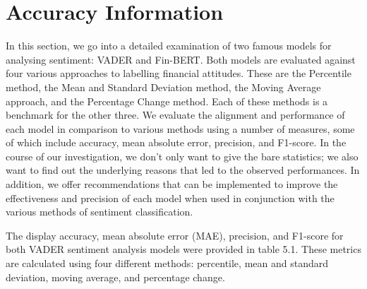 \documentclass[12pt, a4paper,twoside]{report}
\theoremstyle{plain} %
\theoremstyle{definition} %
\theoremstyle{remark} %
\numberwithin{equation}{chapter}
\begin{document}
    \section{Accuracy Information}
    In this section, we go into a detailed examination of two famous models for analysing sentiment: VADER and Fin-BERT. Both models are evaluated against four various approaches to labelling financial attitudes. These are the Percentile method, the Mean and Standard Deviation method, the Moving Average approach, and the Percentage Change method. Each of these methods is a benchmark for the other three. We evaluate the alignment and performance of each model in comparison to various methods using a number of measures, some of which include accuracy, mean absolute error, precision, and F1-score. In the course of our investigation, we don't only want to give the bare statistics; we also want to find out the underlying reasons that led to the observed performances. In addition, we offer recommendations that can be implemented to improve the effectiveness and precision of each model when used in conjunction with the various methods of sentiment classification.

   The display accuracy, mean absolute error (MAE), precision, and F1-score for both VADER sentiment analysis models were provided in table 5.1. These metrics are calculated using four different methods: percentile, mean and standard deviation, moving average, and percentage change.
   
\end{document}
